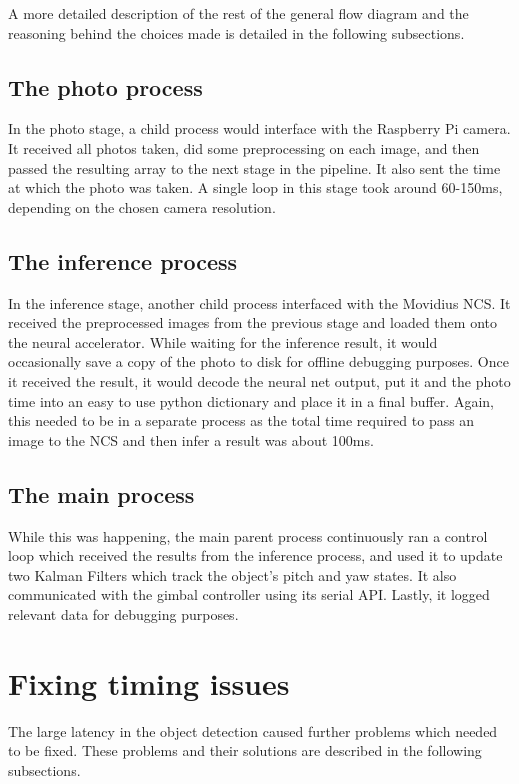 A more detailed description of the rest of the general flow diagram and the reasoning behind the choices made is detailed in the following subsections.

\subsection{The photo process}
In the photo stage, a child process would interface with the Raspberry Pi camera. It received all photos taken, did some preprocessing on each image, and then passed the resulting array to the next stage in the pipeline. It also sent the time at which the photo was taken. A single loop in this stage took around 60-150ms, depending on the chosen camera resolution.

\subsection{The inference process}
In the inference stage, another child process interfaced with the Movidius NCS. It received the preprocessed images from the previous stage and loaded them onto the neural accelerator. While waiting for the inference result, it would occasionally save a copy of the photo to disk for offline debugging purposes. Once it received the result, it would decode the neural net output, put it and the photo time into an easy to use python dictionary and place it in a final buffer. Again, this needed to be in a separate process as the total time required to pass an image to the NCS and then infer a result was about 100ms.

\subsection{The main process}
While this was happening, the main parent process continuously ran a control loop which received the results from the inference process, and used it to update two Kalman Filters which track the object's pitch and yaw states. It also communicated with the gimbal controller using its serial API. Lastly, it logged relevant data for debugging purposes.



\section{Fixing timing issues}
The large latency in the object detection caused further problems which needed to be fixed. These problems and their solutions are described in the following subsections.

